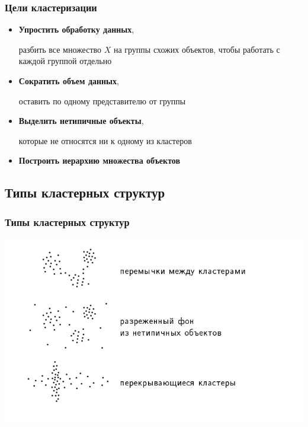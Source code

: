 \documentclass{beamer}
\begin{document}
	\begin{frame}
		\frametitle{Цели кластеризации}

		\begin{itemize}
			\item \textbf{Упростить обработку данных},

			разбить все множество $X$ на группы схожих объектов,
			чтобы работать с каждой группой отдельно
			\item \textbf{Сократить объем данных},

			оставить по одному представителю от группы
			\item \textbf{Выделить нетипичные объекты},
			
			которые не относятся ни к одному из кластеров
			\item \textbf{Построить иерархию множества объектов}
		\end{itemize}
	\end{frame}

	\subsection{Типы кластерных структур}

	\begin{frame}
		\frametitle{Типы кластерных структур}

		\includegraphics[width=1\textwidth]{img/struct_1.png}

	\end{frame}
\end{document}
